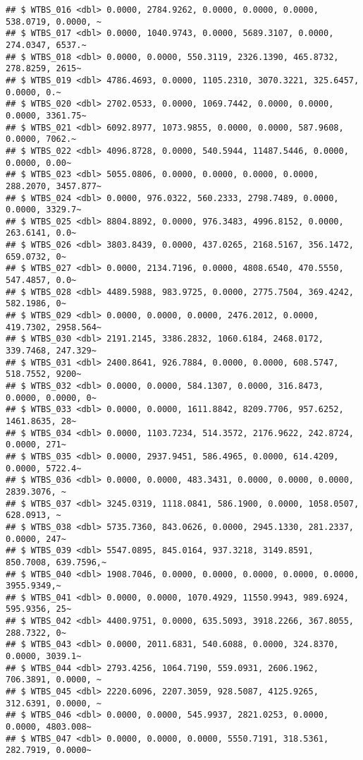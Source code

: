 \documentclass[
]{article}
\begin{document}
\begin{verbatim}
## $ WTBS_016 <dbl> 0.0000, 2784.9262, 0.0000, 0.0000, 0.0000, 538.0719, 0.0000, ~
## $ WTBS_017 <dbl> 0.0000, 1040.9743, 0.0000, 5689.3107, 0.0000, 274.0347, 6537.~
## $ WTBS_018 <dbl> 0.0000, 0.0000, 550.3119, 2326.1390, 465.8732, 278.8259, 2615~
## $ WTBS_019 <dbl> 4786.4693, 0.0000, 1105.2310, 3070.3221, 325.6457, 0.0000, 0.~
## $ WTBS_020 <dbl> 2702.0533, 0.0000, 1069.7442, 0.0000, 0.0000, 0.0000, 3361.75~
## $ WTBS_021 <dbl> 6092.8977, 1073.9855, 0.0000, 0.0000, 587.9608, 0.0000, 7062.~
## $ WTBS_022 <dbl> 4096.8728, 0.0000, 540.5944, 11487.5446, 0.0000, 0.0000, 0.00~
## $ WTBS_023 <dbl> 5055.0806, 0.0000, 0.0000, 0.0000, 0.0000, 288.2070, 3457.877~
## $ WTBS_024 <dbl> 0.0000, 976.0322, 560.2333, 2798.7489, 0.0000, 0.0000, 3329.7~
## $ WTBS_025 <dbl> 8804.8892, 0.0000, 976.3483, 4996.8152, 0.0000, 263.6141, 0.0~
## $ WTBS_026 <dbl> 3803.8439, 0.0000, 437.0265, 2168.5167, 356.1472, 659.0732, 0~
## $ WTBS_027 <dbl> 0.0000, 2134.7196, 0.0000, 4808.6540, 470.5550, 547.4857, 0.0~
## $ WTBS_028 <dbl> 4489.5988, 983.9725, 0.0000, 2775.7504, 369.4242, 582.1986, 0~
## $ WTBS_029 <dbl> 0.0000, 0.0000, 0.0000, 2476.2012, 0.0000, 419.7302, 2958.564~
## $ WTBS_030 <dbl> 2191.2145, 3386.2832, 1060.6184, 2468.0172, 339.7468, 247.329~
## $ WTBS_031 <dbl> 2400.8641, 926.7884, 0.0000, 0.0000, 608.5747, 518.7552, 9200~
## $ WTBS_032 <dbl> 0.0000, 0.0000, 584.1307, 0.0000, 316.8473, 0.0000, 0.0000, 0~
## $ WTBS_033 <dbl> 0.0000, 0.0000, 1611.8842, 8209.7706, 957.6252, 1461.8635, 28~
## $ WTBS_034 <dbl> 0.0000, 1103.7234, 514.3572, 2176.9622, 242.8724, 0.0000, 271~
## $ WTBS_035 <dbl> 0.0000, 2937.9451, 586.4965, 0.0000, 614.4209, 0.0000, 5722.4~
## $ WTBS_036 <dbl> 0.0000, 0.0000, 483.3431, 0.0000, 0.0000, 0.0000, 2839.3076, ~
## $ WTBS_037 <dbl> 3245.0319, 1118.0841, 586.1900, 0.0000, 1058.0507, 628.0913, ~
## $ WTBS_038 <dbl> 5735.7360, 843.0626, 0.0000, 2945.1330, 281.2337, 0.0000, 247~
## $ WTBS_039 <dbl> 5547.0895, 845.0164, 937.3218, 3149.8591, 850.7008, 639.7596,~
## $ WTBS_040 <dbl> 1908.7046, 0.0000, 0.0000, 0.0000, 0.0000, 0.0000, 3955.9349,~
## $ WTBS_041 <dbl> 0.0000, 0.0000, 1070.4929, 11550.9943, 989.6924, 595.9356, 25~
## $ WTBS_042 <dbl> 4400.9751, 0.0000, 635.5093, 3918.2266, 367.8055, 288.7322, 0~
## $ WTBS_043 <dbl> 0.0000, 2011.6831, 540.6088, 0.0000, 324.8370, 0.0000, 3039.1~
## $ WTBS_044 <dbl> 2793.4256, 1064.7190, 559.0931, 2606.1962, 706.3891, 0.0000, ~
## $ WTBS_045 <dbl> 2220.6096, 2207.3059, 928.5087, 4125.9265, 312.6391, 0.0000, ~
## $ WTBS_046 <dbl> 0.0000, 0.0000, 545.9937, 2821.0253, 0.0000, 0.0000, 4803.008~
## $ WTBS_047 <dbl> 0.0000, 0.0000, 0.0000, 5550.7191, 318.5361, 282.7919, 0.0000~

\end{verbatim}
\end{document}
